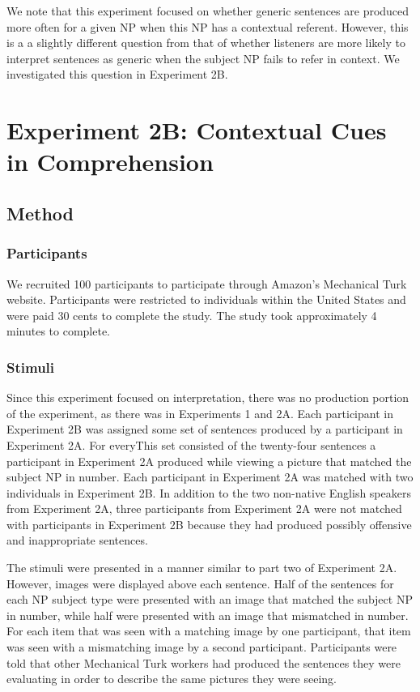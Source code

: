 \documentclass[10pt,letterpaper]{article}
\begin{document}
We note that this experiment focused on whether generic sentences are produced more often for a given NP when this NP has a contextual referent. However, this is a a slightly different question from that of whether listeners are more likely to interpret sentences as generic when the subject NP fails to refer in context. We investigated this question in Experiment 2B. 

\section{Experiment 2B: Contextual Cues in Comprehension}

\subsection{Method}

\subsubsection{Participants} \quad We recruited 100 participants to participate through Amazon's Mechanical Turk website. Participants were restricted to individuals within the United States and were paid 30 cents to complete the study. The study took approximately 4 minutes to complete.

\subsubsection{Stimuli} \quad Since this experiment focused on interpretation, there was no production portion of the experiment, as there was in Experiments 1 and 2A. Each participant in Experiment 2B was assigned some set of sentences produced by a participant in Experiment 2A. For everyThis set consisted of the twenty-four sentences a participant in Experiment 2A produced while viewing a picture that matched the subject NP in number. Each participant in Experiment 2A was matched with two individuals in Experiment 2B. In addition to the two non-native English speakers from Experiment 2A, three participants from Experiment 2A were not matched with participants in Experiment 2B because they had produced possibly offensive and inappropriate sentences.

The stimuli were presented in a manner similar to part two of Experiment 2A. However, images were displayed above each sentence. Half of the sentences for each NP subject type were presented with an image that matched the subject NP in number, while half were presented with an image that mismatched in number. For each item that was seen with a matching image by one participant, that item was seen with a mismatching image by a second participant. Participants were told that other Mechanical Turk workers had produced the sentences they were evaluating in order to describe the same pictures they were seeing.
\end{document}
